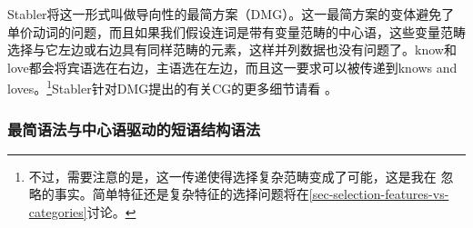 Stabler将这一形式叫做导向性的最简方案（DMG）。这一最简方案的变体避免了单价动词的问题，而且如果我们假设连词是带有变量范畴的中心语，这些变量范畴选择与它左边或右边具有同样范畴的元素，这样并列数据也没有问题了。know和love都会将宾语选在右边，主语选在左边，而且这一要求可以被传递到knows and loves。\footnote{%
不过，需要注意的是，这一传递使得选择复杂范畴变成了可能，这是我在 忽略的事实。简单特征还是复杂特征的选择问题将在\ref{sec-selection-features-vs-categories}讨论。}Stabler针对DMG提出的有关CG的更多细节请看 。
\nocite{Pollard88a}


\subsubsection{最简语法与中心语驱动的短语结构语法}
\label{sec-minimalism-atb-extraction}

